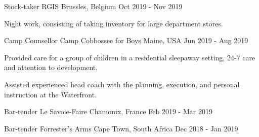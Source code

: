 

\begin{cventries}

\cventry
{Stock-taker} %
{RGIS} %
{Brussles, Belgium} %
{Oct 2019 - Nov 2019} %
{
  \begin{cvitems} %
    \item {Night work, consisting of taking inventory for large department stores.}
  \end{cvitems}
}


  \cventry
    {Camp Counsellor} %
    {Camp Cobbossee for Boys} %
    {Maine, USA} %
    {Jun 2019 - Aug 2019} %
    {
      \begin{cvitems} %
        \item {Provided care for a group of children in a residential sleepaway setting, 24-7 care and attention to development.}
        \item {Assisted experienced head coach with the planning, execution, and personal instruction at the Waterfront.}
      \end{cvitems}
    }


\cventry
{Bar-tender} %
{Le Savoie-Faire} %
{Chamonix, France} %
{Feb 2019 - Mar 2019} %
{}


\cventry
{Bar-tender} %
{Forrester's Arms} %
{Cape Town, South Africa} %
{Dec 2018 - Jan 2019} %
{}




\end{cventries}
